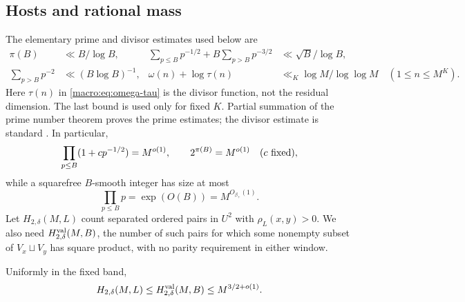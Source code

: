 \subsection{Hosts and rational mass}
The elementary prime and divisor estimates used below are
\begin{align}
 \pi(B)&\ll B/\log B,&
 \sum_{p\le B}p^{-1/2}+B\sum_{p>B}p^{-3/2}
 &\ll \sqrt B/\log B,\label{macro:eq:prime-half}\\
 \sum_{p>B}p^{-2}&\ll(B\log B)^{-1},&
 \omega(n)+\log\tau(n)&\ll_K\log M/\log\log M
 \quad(1\le n\le M^K).
 \label{macro:eq:omega-tau}
\end{align}
Here $\tau(n)$ in \eqref{macro:eq:omega-tau} is the divisor function,
not the residual dimension. The last bound is used only for fixed $K$.
Partial summation of the prime number theorem proves the prime estimates;
the divisor estimate is standard \cite{Tenenbaum2015,NicolasRobin1983}.
In particular,
\begin{equation}\label{macro:eq:euler-subpoly}
 \prod_{p\le B}(1+c p^{-1/2})=M^{o(1)},\qquad 2^{\pi(B)}=M^{o(1)}
 \quad(c\hbox{ fixed}),
\end{equation}
while a squarefree $B$-smooth integer has size at most
\begin{equation}\label{macro:eq:Bsmooth-height}
 \prod_{p\le B}p=\exp(O(B))=M^{O_{\beta_+}(1)}.
\end{equation}
Let $H_{2,\delta}(M,L)$ count separated ordered pairs in $U^2$ with
$\rho_L(x,y)>0$. We also need $H^{\rm val}_{2,\delta}(M,B)$, the number of
such pairs for which some nonempty subset of $V_x\sqcup V_y$ has square
product, with no parity requirement in either window.
\begin{proposition}\label{macro:prop:host}
Uniformly in the fixed band,
\[
 H_{2,\delta}(M,L)\le H^{\rm val}_{2,\delta}(M,B)\le M^{3/2+o(1)}.
\]
\end{proposition}

